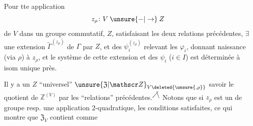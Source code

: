 Pour tte application
\[
z_{\rho}\colon V\mathbin{\unsure{-|\to}}Z
\]
de $V$ dans un groupe commutatif, $Z$,
satisfaisant les deux relations précédentes,
$\exists$ une extension $\widetilde{\Gamma}^{(z_\rho)}$ de $\Gamma$ par $Z$,
et des $\psi_i^{(z_\rho)}$ relevant les $\varphi_i$, donnant
naissance (via $\rho$) à $z_\rho$, et
le système de cette extension et
des $\psi_i$ ($i\in I$) est déterminée à isom
unique près.

Il y a un $Z$ ``universel'' $\unsure{\mathfrak Z|\mathscr Z}_{V\deleted{\unsure{,\rho}}}$
savoir le quotient de $\mathbb Z^{(V)}$ par
les ``relations'' précédentes.\textsuperscript{\ensuremath{\diagup\mkern-6mu\backslash}}
Notons que si $z_\rho$ est  un  de groupe
resp. une application $2$-quadratique, les
conditions  satisfaites, ce qui
montre que $\mathfrak Z_V$ contient comme

